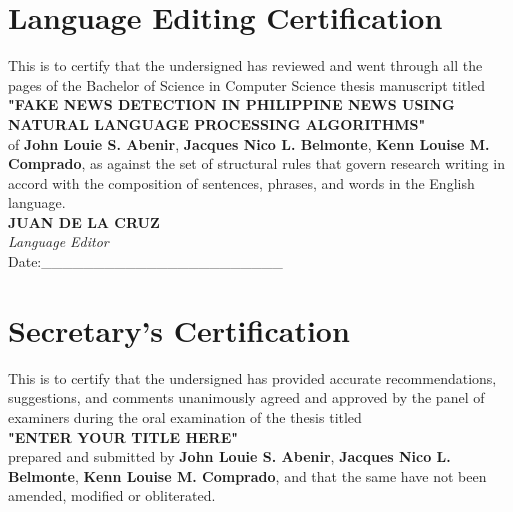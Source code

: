 

\begin{theappendices}

\chapter{Language Editing Certification}
\centering

This is to certify that the undersigned has reviewed and went through all the pages of the Bachelor of Science in Computer Science thesis manuscript titled \\

\textbf{"FAKE NEWS DETECTION IN PHILIPPINE NEWS USING NATURAL LANGUAGE PROCESSING ALGORITHMS"} \\


of \textbf{John Louie S. Abenir}, \textbf{Jacques Nico L. Belmonte}, \textbf{Kenn Louise M. Comprado}, as against the set of structural rules that govern research writing in accord with the composition of sentences, phrases, and words in the English language.
 \newline \newline \newline \\

\noindent \textbf{JUAN DE LA CRUZ} \\
\textit{Language Editor} \\

Date:\_\_\_\_\_\_\_\_\_\_\_\_\_\_\_\_\_\_\_\_\_\_\_


\chapter{Secretary's Certification}
\centering

This is to certify that the undersigned has provided accurate recommendations, suggestions, and comments unanimously agreed and approved by the panel of examiners during the oral examination of the thesis titled \\ \textbf{"ENTER YOUR TITLE HERE"} \\  prepared and submitted by \textbf{John Louie S. Abenir}, \textbf{Jacques Nico L. Belmonte}, \textbf{Kenn Louise M. Comprado}, and that the same have not been amended, modified or obliterated. \newline \newline \newline \\




\end{theappendices}
